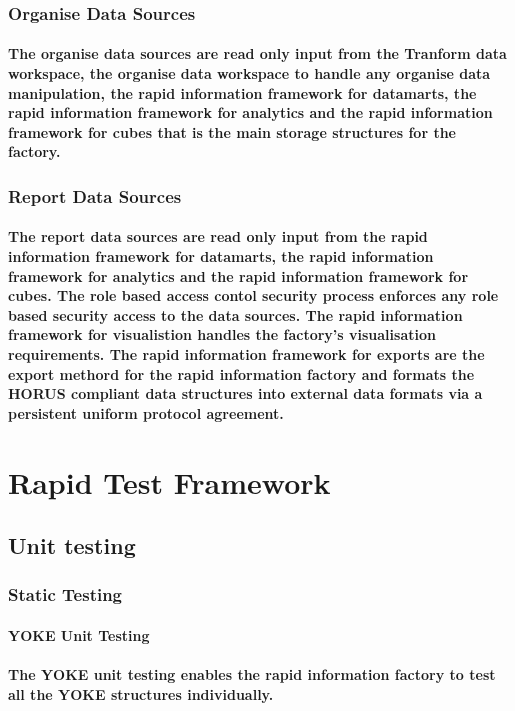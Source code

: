 \subsubsection{Organise Data Sources}
\paragraph{The organise data sources are read only input from the Tranform data workspace, the organise data workspace to handle any organise data manipulation, the rapid information framework for datamarts, the rapid information framework for analytics and the rapid information framework for cubes that is the main storage structures for the factory.}
\subsubsection{Report Data Sources}
\paragraph{The report data sources are read only input from the rapid information framework for datamarts, the rapid information framework for analytics and the rapid information framework for cubes. The role based access contol security process enforces any role based security access to the data sources. The rapid information framework for visualistion handles the factory's visualisation requirements. The rapid information framework for exports are the export methord for the rapid information factory and formats the HORUS compliant data structures into external data formats via a persistent uniform protocol agreement.}
\pagebreak
\section{Rapid Test Framework}
\subsection{Unit testing}
\subsubsection{Static Testing}
\paragraph{YOKE Unit Testing}
\paragraph{The YOKE unit testing enables the rapid information factory to test all the YOKE structures individually.}
